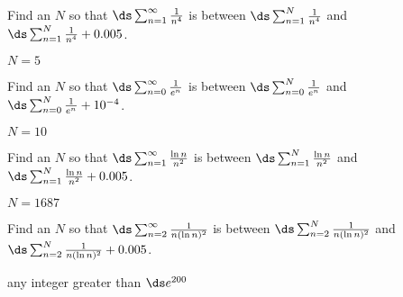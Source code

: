 \begin{enumialphparenastyle}
\begin{ex}
Find an $N$ so that
$\ds\sum_{n=1}^\infty {1\over n^4}$ is between
$\ds\sum_{n=1}^N {1\over n^4}$ and
$\ds\sum_{n=1}^N {1\over n^4} + 0.005$.
\begin{sol}
$N=5$
\end{sol}
\end{ex}

\begin{ex}
Find an $N$ so that
$\ds\sum_{n=0}^\infty {1\over e^n}$ is between
$\ds\sum_{n=0}^N {1\over e^n}$ and
$\ds\sum_{n=0}^N {1\over e^n} + 10^{-4}$.
\begin{sol}
$N=10$
\end{sol}
\end{ex}

\begin{ex}
Find an $N$ so that
$\ds\sum_{n=1}^\infty {\ln n\over n^2}$ is between
$\ds\sum_{n=1}^N {\ln n\over n^2}$ and
$\ds\sum_{n=1}^N {\ln n\over n^2} + 0.005$.
\begin{sol}
$N=1687$
\end{sol}
\end{ex}

\begin{ex}
Find an $N$ so that
$\ds\sum_{n=2}^\infty {1\over n(\ln n)^2}$ is between
$\ds\sum_{n=2}^N {1\over n(\ln n)^2}$ and
$\ds\sum_{n=2}^N {1\over n(\ln n)^2} + 0.005$.
\begin{sol}
any integer greater than $\ds e^{200}$
\end{sol}
\end{ex}

\end{enumialphparenastyle}